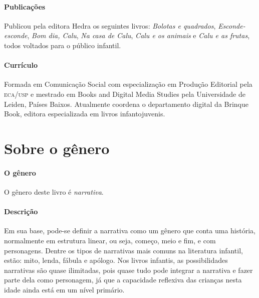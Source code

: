 \documentclass[11pt]{extarticle}
\begin{document}


\paragraph{Publicações}
Publicou pela editora Hedra os seguintes livros: \emph{Bolotas e quadrados},
\emph{Esconde-esconde}, \emph{Bom dia, Calu}, \emph{Na casa de Calu}, \emph{Calu e os animais} e
\emph{Calu e as frutas}, todos voltados para o público infantil.

\paragraph{Currículo} 
Formada em Comunicação Social com 
especialização em Produção Editorial pela \textsc{eca/usp} 
e mestrado em Books and Digital Media Studies pela 
Universidade de Leiden, Países Baixos.
Atualmente coordena o departamento digital da Brinque 
Book, editora especializada em livros infantojuvenis.

\section{Sobre o gênero}

\paragraph{O gênero} O gênero deste livro é \textit{narrativa}. 


\paragraph{Descrição} Em sua base, pode-se definir a narrativa como um gênero que conta uma história, normalmente em estrutura linear, ou seja, começo, meio e fim, e com personagens. 
Dentre os tipos de narrativas mais comuns na literatura infantil, estão: mito, lenda, 
fábula e apólogo. Nos livros infantis, as possibilidades narrativas são quase ilimitadas, pois quase tudo pode integrar a narrativa e fazer parte dela como personagem, já que a capacidade reflexiva das crianças nesta idade ainda está em um nível primário. 
\end{document}

